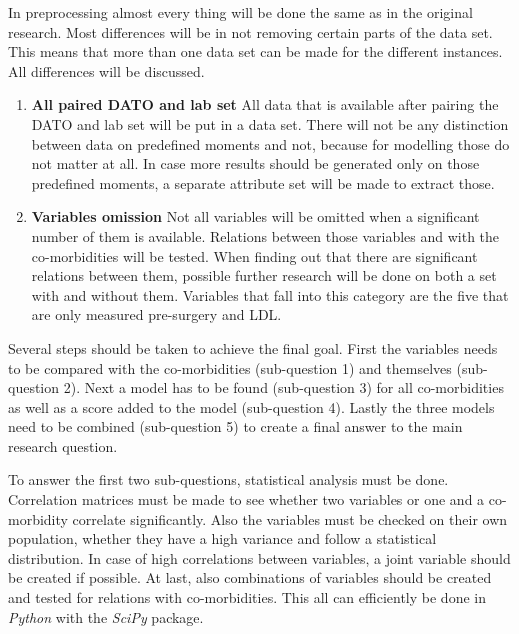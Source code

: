 \documentclass[10pt,a4paper]{report}
\begin{document}
	In preprocessing almost every thing will be done the same as in the original research. Most differences will be in not removing certain parts of the data set. This means that more than one data set can be made for the different instances. All differences will be discussed.
	
	\begin{enumerate}
		\item \textbf{All paired DATO and lab set} All data that is available after pairing the DATO and lab set will be put in a data set. There will not be any distinction between data on predefined moments and not, because for modelling those do not matter at all. In case more results should be generated only on those predefined moments, a separate attribute set will be made to extract those.
		
		\item \textbf{Variables omission} Not all variables will be omitted when a significant number of them is available. Relations between those variables and with the co-morbidities will be tested. When finding out that there are significant relations between them, possible further research will be done on both a set with and without them. Variables that fall into this category are the five that are only measured pre-surgery and LDL.
		
	\end{enumerate}
	
	Several steps should be taken to achieve the final goal. First the variables needs to be compared with the co-morbidities (sub-question 1) and themselves (sub-question 2). Next a model has to be found (sub-question 3) for all co-morbidities as well as a score added to the model (sub-question 4). Lastly the three models need to be combined (sub-question 5) to create a final answer to the main research question.
	
	To answer the first two sub-questions, statistical analysis must be done. Correlation matrices must be made to see whether two variables or one and a co-morbidity correlate significantly. Also the variables must be checked on their own population, whether they have a high variance and follow a statistical distribution. In case of high correlations between variables, a joint variable should be created if possible. At last, also combinations of variables should be created and tested for relations with co-morbidities. This all can efficiently be done in \textit{Python} with the \textit{SciPy} package.
	
\end{document}
